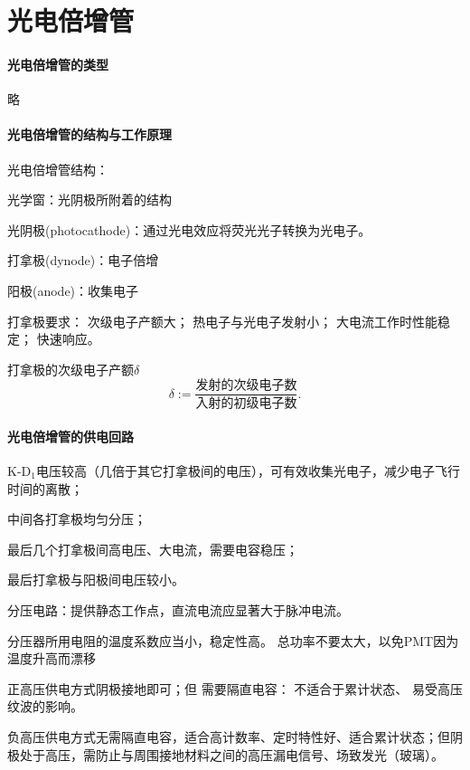 \section{光电倍增管}

\paragraph{光电倍增管的类型}略
\paragraph{光电倍增管的结构与工作原理}
光电倍增管结构：
\begin{compactenum}
	\item 光学窗：光阴极所附着的结构
	\item 光阴极(photocathode)：通过光电效应将荧光光子转换为光电子。%
	\item 打拿极(dynode)：电子倍增
	\item 阳极(anode)：收集电子
\end{compactenum}

打拿极要求：
次级电子产额大；
热电子与光电子发射小；
大电流工作时性能稳定；
快速响应。

打拿极的次级电子产额$\delta$
\[
	\delta:=\frac{\text{发射的次级电子数}}{\text{入射的初级电子数}}.
\]

\paragraph{光电倍增管的供电回路}
\begin{compactenum}
	\item K-D$_1$电压较高（几倍于其它打拿极间的电压），可有效收集光电子，减少电子飞行时间的离散；
	\item 中间各打拿极均匀分压；
	\item 最后几个打拿极间高电压、大电流，需要电容稳压；
	\item 最后打拿极与阳极间电压较小。
\end{compactenum}
分压电路：提供静态工作点，直流电流应显著大于脉冲电流。

分压器所用电阻的温度系数应当小，稳定性高。
总功率不要太大，以免PMT因为温度升高而漂移

正高压供电方式阴极接地即可；但
需要隔直电容：
不适合于累计状态、
易受高压纹波的影响。

负高压供电方式无需隔直电容，适合高计数率、定时特性好、适合累计状态；但阴极处于高压，需防止与周围接地材料之间的高压漏电信号、场致发光（玻璃）。
